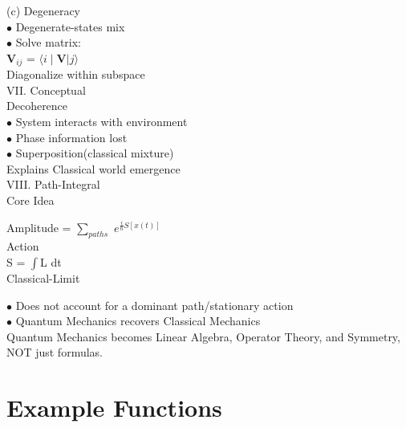 \documentclass[a4paper, 10pt, onepage]{elegantbook}
\begin{document}
{(c) Degeneracy \\
 
$\bullet$ Degenerate-states mix \\
 
$\bullet$ Solve matrix: \\
  
    $\mathbf V_{ij}$ = $\langle i\mid \mathbf {V}|j \rangle$ \\
 
    Diagonalize within subspace \\

VII. Conceptual \\ 


Decoherence \\  

$\bullet$ System interacts with environment \\
 
$\bullet$ Phase information lost \\
 
$\bullet$ Superposition(classical mixture)  \\
  
Explains Classical world emergence  \\

VIII. Path-Integral \\ 

Core Idea  

Amplitude = $\sum_{paths}$ $e^{\frac{i}{\hbar} S[x(t)]}$  \\  

Action \\ 

S = $\int$L dt  \\  

Classical-Limit  

$\bullet$ Does not account for a dominant path/stationary action  \\

$\bullet$ Quantum Mechanics recovers Classical Mechanics \\

Quantum Mechanics becomes Linear Algebra, Operator Theory, and Symmetry, NOT just formulas.  \\

\chapter{Example Functions}

}
\end{document}
